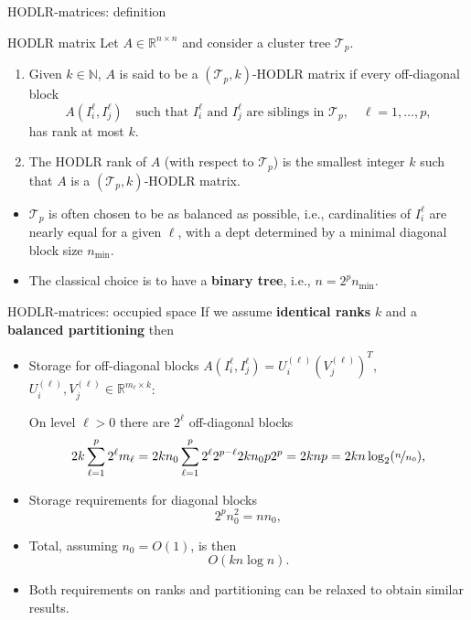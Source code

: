 \documentclass[aspectratio=169,xcolor=dvipsnames]{beamer}
\begin{document}
	\begin{frame}{HODLR-matrices: definition}

	\begin{block}{HODLR matrix}
	Let $A\in \mathbb{R}^{n\times n}$ and consider a cluster tree $\mathcal T_p$. 
	\begin{enumerate}
		\item Given $k\in \mathbb N$, $A$ is said to be a $(\mathcal T_p,k)$-HODLR matrix if every off-diagonal block
		\begin{equation*}
			A(I_i^\ell,I_j^\ell) \quad \text{such that $I_i^\ell$ and $I_j^\ell$ are siblings in $\mathcal T_p$}, \quad \ell=1,\dots,p,
		\end{equation*} has rank at most $k$.
		\item The HODLR rank of $A$ (with respect to $\mathcal T_p$)  is the smallest integer $k$ such that $A$ is a $(\mathcal T_p,k)$-HODLR matrix.
	\end{enumerate}
	\end{block}

	\begin{itemize}
		\item[\faSeedling]<2-> $\mathcal T_p$ is often chosen to be \alert{as balanced as possible}, i.e., cardinalities of $I^\ell_i$ are nearly equal for a given $\ell$, with a dept determined by a minimal diagonal block
		size $n_{\mathrm{min}}$.
		\item[\faCog]<3-> The classical choice is to have a \textbf{binary tree}, i.e., $n = 2^p n_{\mathrm{min}}$.
	\end{itemize}

	\end{frame}

	\begin{frame}{HODLR-matrices: occupied space}
	If we assume \textbf{identical ranks} $k$ and a \textbf{balanced partitioning} then
	\begin{itemize}
		\item[\faMoneyBillWave] Storage for off-diagonal blocks $A(I_i^\ell,I_j^\ell) = U_i^{(\ell)}(V_j^{(\ell)})^T$, $U_i^{(\ell)},V_j^{(\ell)} \in \mathbb{R}^{m_\ell \times k}$:
		
		On level $\ell > 0$ there are $2^\ell$ off-diagonal blocks
		\[
		2k \sum_{\ell = 1}^{p} 2^\ell m_\ell = 2 k n_0 \sum_{\ell = 1}^{p} 2^\ell 2^{p-\ell} 2 k n_0 p 2^p = 2 k n p = 2 k n \log_2(\nicefrac{n}{n_0}),
		\]
		\item[\faMoneyBillWave]<2-> Storage requirements for diagonal blocks
		\[
		2^p n_0^2 = n n_0, 
		\]
		\item[\faMoneyCheck]<3-> Total, assuming $n_0 = O(1)$, is then
		\[
		O(k n \log n).
		\]
		\item[\faArrowAltCircleDown]<4-> Both \alert{requirements} on ranks and partitioning can be \alert{relaxed to obtain similar results}.
	\end{itemize}
	\end{frame}
\end{document}
